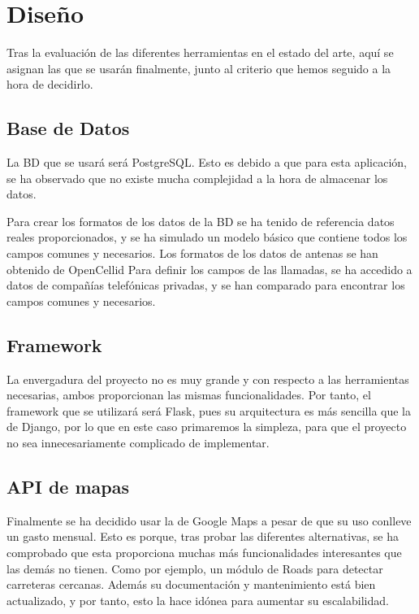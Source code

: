   
\section{Diseño\label{SEC:DISENO}}
  Tras la evaluación de las diferentes herramientas en el estado del arte, aquí se asignan las que se usarán finalmente, junto al criterio que hemos seguido a la hora de decidirlo.
  
  \subsection{Base de Datos}
    La BD que se usará será PostgreSQL. Esto es debido a que para esta aplicación, se ha observado que no existe mucha complejidad a la hora de almacenar los datos.
    
    Para crear los formatos de los datos de la BD se ha tenido de referencia datos reales proporcionados, y se ha simulado un modelo básico que contiene todos los campos comunes y necesarios.
    Los formatos de los datos de antenas se han obtenido de OpenCellid \cite{opencellid}
    Para definir los campos de las llamadas, se ha accedido a datos de compañías telefónicas privadas, y se han comparado para encontrar los campos comunes y necesarios.
    

    
    
  \subsection{Framework}
    La envergadura del proyecto no es muy grande y con respecto a las herramientas necesarias, ambos proporcionan las mismas funcionalidades. Por tanto, el framework que se utilizará será Flask, pues su arquitectura es más sencilla que la de Django, por lo que en este caso primaremos la simpleza, para que el proyecto no sea innecesariamente complicado de implementar.

  \subsection{API de mapas}
    Finalmente se ha decidido usar la  de Google Maps\cite{gmaps} a pesar de que su uso conlleve un gasto mensual. Esto es porque, tras probar las diferentes alternativas, se ha comprobado que esta  proporciona muchas más funcionalidades interesantes que las demás no tienen. Como por ejemplo, un módulo de Roads para detectar carreteras cercanas.
    Además su documentación y mantenimiento está bien actualizado, y por tanto, esto la hace idónea para aumentar su escalabilidad.
    
